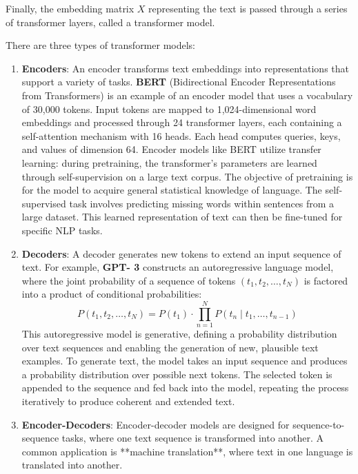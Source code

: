 Finally, the embedding matrix $X$ representing the text is passed through a series of transformer layers, called a 
transformer model. 


There are three types of transformer models:  
\begin{enumerate}
    \item \textbf{Encoders}: An encoder transforms text embeddings into representations that support a variety of tasks. 
        \textbf{BERT} (Bidirectional Encoder Representations from Transformers) is an example of an encoder model that 
        uses a vocabulary of 30,000 tokens. Input tokens are mapped to 1,024-dimensional word embeddings and processed 
        through 24 transformer layers, each containing a self-attention mechanism with 16 heads. Each head computes 
        queries, keys, and values of dimension 64. Encoder models like BERT utilize transfer learning: during 
        pretraining, the transformer’s parameters are learned through self-supervision on a large text corpus. The 
        objective of pretraining is for the model to acquire general statistical knowledge of language. The self-
        supervised task involves predicting missing words within sentences from a large dataset. This learned 
        representation of text can then be fine-tuned for specific NLP tasks.  
    \item \textbf{Decoders}: A decoder generates new tokens to extend an input sequence of text. For example, \textbf{GPT-
        3} constructs an autoregressive language model, where the joint probability of a sequence of tokens \((t_1, t_2,
        \dots, t_N)\) is factored into a product of conditional probabilities:  
        \begin{equation}
            P(t_1, t_2, \dots, t_N) = P(t_1) \cdot \prod_{n=1}^N P(t_n \mid t_1, \dots, t_{n-1})
        \end{equation}  
        This autoregressive model is generative, defining a probability distribution over text sequences and enabling the 
        generation of new, plausible text examples. To generate text, the model takes an input sequence and produces a 
        probability distribution over possible next tokens. The selected token is appended to the sequence and fed back 
        into the model, repeating the process iteratively to produce coherent and extended text.  
   \item \textbf{Encoder-Decoders}: Encoder-decoder models are designed for sequence-to-sequence tasks, where one text 
        sequence is transformed into another. A common application is **machine translation**, where text in one language 
        is translated into another.  
\end{enumerate}
